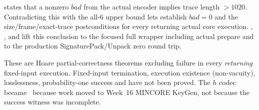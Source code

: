 \begin{verified}
 states that a nonzero
\(bad\) from the actual encoder implies trace length \(>1020\). Contradicting
this with the all-6 upper bound lets
 establish \(bad=0\) and the
size/frame/exact-trace postconditions for every returning actual core execution.
,
, and
 lift this conclusion
to the focused full wrapper including actual prepare and to the production
SignaturePack/Unpack zero round trip.
\end{verified}

\begin{caution}
These are Hoare partial-correctness theorems excluding failure in every
\emph{returning} fixed-input execution. Fixed-input termination, execution
existence (non-vacuity), losslessness, probability-one success and
 have not been proved. The \(h\) codec became
\statusdeferred\ because work moved to Week~16 MINCORE KeyGen, not because
the success witness was incomplete.
\end{caution}

